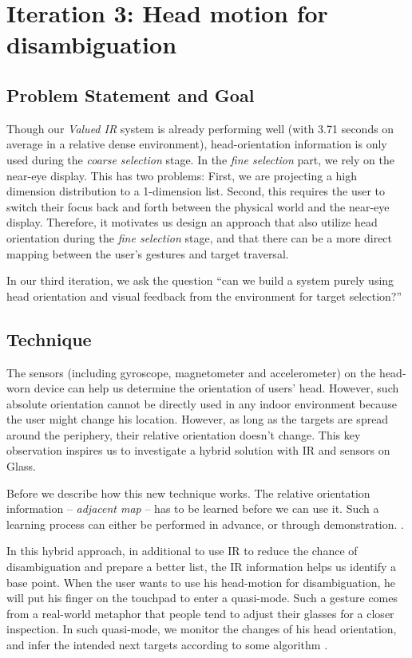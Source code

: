 \section{Iteration 3: Head motion for disambiguation}
\label{sec:iteration-3:-head}
\subsection{Problem Statement and Goal}
Though our {\em Valued IR} system is already performing well (with 3.71 seconds on average in a relative dense environment), head-orientation information is only used during the {\em coarse selection} stage. In the {\em fine selection} part, we rely on the near-eye display. This has two problems: First, we are projecting a high dimension distribution to a 1-dimension list. Second, this requires the user to switch their focus back and forth between the physical world and the near-eye display. Therefore, it motivates us design an approach that also utilize head orientation during the {\em fine selection} stage, and that there can be a more direct mapping between the user's gestures and target traversal. 

In our third iteration, we ask the question ``can we build a system purely using head orientation and visual feedback from the environment for target selection?''

\subsection{Technique}
The sensors (including gyroscope, magnetometer and accelerometer) on the head-worn device can help us determine the orientation of users' head. However, such absolute orientation cannot be directly used in any indoor environment because the user might change his location. However, as long as the targets are spread around the periphery, their relative orientation doesn't change. This key observation inspires us to investigate a hybrid solution with IR and sensors on Glass.

Before we describe how this new technique works. The relative orientation information -- {\em adjacent map} -- has to be learned before we can use it. Such a learning process can either be performed in advance, or through demonstration. .

In this hybrid approach, in additional to use IR to reduce the chance of disambiguation and prepare a better list, the IR information helps us identify a base point. When the user wants to use his head-motion for disambiguation, he will put his finger on the touchpad to enter a quasi-mode. Such a gesture comes from a real-world metaphor that people tend to adjust their glasses for a closer inspection. In such quasi-mode, we monitor the changes of his head orientation, and infer the intended next targets according to some algorithm .


